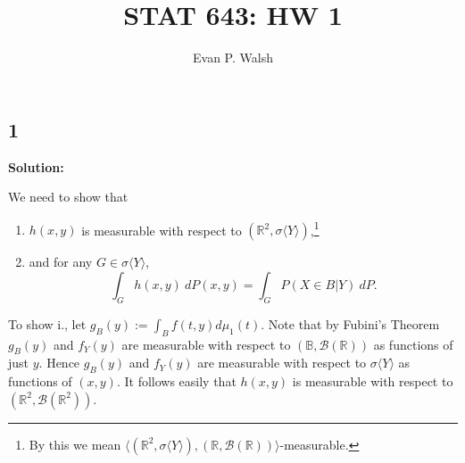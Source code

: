 \documentclass[12pt]{article}
\title{STAT 643: HW 1}
\author{Evan P. Walsh}
\begin{document}
\maketitle

\subsection*{1}
\begin{tcolorbox}

\end{tcolorbox}

{\bf Solution:}

We need to show that 
\begin{enumerate}[label=\roman*.]
  \item $h(x,y)$ is measurable with respect to $(\mathbb{R}^{2}, \sigma\langle Y\rangle )$,\footnote{By this we mean $\langle
      (\mathbb{R}^{2}, \sigma \langle Y\rangle), (\mathbb{R}, \mathcal{B}(\mathbb{R}))\rangle$-measurable.} \\
    \item and for any $G \in \sigma\langle Y\rangle$, 
      \begin{equation}
        \int_{G}h(x,y)\ dP(x,y) = \int_{G} P(X\in B | Y)\ dP.
        \label{1.1}
      \end{equation}
\end{enumerate}

To show i., let $g_{B}(y) := \int_{B}f(t,y)d\mu_{1}(t)$. Note that by Fubini's Theorem $g_{B}(y)$ and $f_{Y}(y)$ are measurable with respect to 
$(\mathbb{B}, \mathcal{B}(\mathbb{R}))$ as functions of just $y$. Hence $g_{B}(y)$ and $f_{Y}(y)$ are measurable with respect to $\sigma\langle
Y\rangle$ as functions of $(x,y)$. It follows easily that $h(x,y)$ is measurable with respect to $(\mathbb{R}^{2}, \mathcal{B}(\mathbb{R}^{2}))$.
\end{document}
